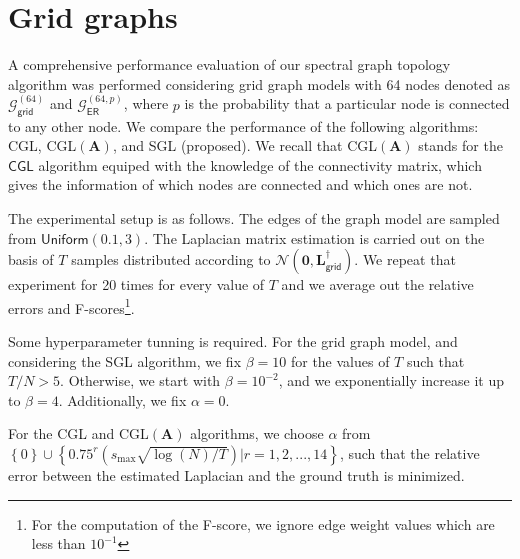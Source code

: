 \section{Grid graphs}
A comprehensive performance evaluation of our spectral graph topology algorithm was
performed considering grid graph models with 64 nodes denoted as
$\mathcal{G}^{(64)}_{\mathsf{grid}}$ and $\mathcal{G}^{(64, p)}_{\mathsf{ER}}$, where
$p$ is the probability that a particular node is connected to any other node.
We compare the performance of the following algorithms: \textsf{CGL}, \textsf{CGL}$(\mathbf{A})$,
and \textsf{SGL} (proposed). We recall that \textsf{CGL}$(\mathbf{A})$ stands for the $\textsf{CGL}$
algorithm equiped with the knowledge of the connectivity matrix, which gives the information of
which nodes are connected and which ones are not.

The experimental setup is as follows. The edges of the graph model are sampled from $\mathsf{Uniform}(0.1, 3)$.
The Laplacian matrix estimation is carried out on the basis of $T$ samples distributed according to
$\mathcal{N}(\mathbf{0}, \mathbf{L}_{\mathsf{grid}}^{\dagger})$. We repeat that experiment for 20 times
for every value of $T$ and we average out the relative errors and F-scores\footnote{For the computation of the
F-score, we ignore edge weight values which are less than $10^{-1}$}.

Some hyperparameter tunning is required. For the grid graph model, and considering the
\textsf{SGL} algorithm, we fix $\beta = 10$ for the values of $T$ such that $T / N > 5$.
Otherwise, we start with $\beta = 10^{-2}$, and we exponentially increase it up to $\beta = 4$.
Additionally, we fix $\alpha = 0$.

For the \textsf{CGL} and \textsf{CGL}$(\mathbf{A})$ algorithms,
we choose $\alpha$ from $\left\{0\right\}\cup\left\{0.75^{r}\left(s_{\text{max}}
\sqrt{\log(N) / T}\right) | r = 1, 2, ..., 14\right\}$, such that the relative error between
the estimated Laplacian and the ground truth is minimized.

